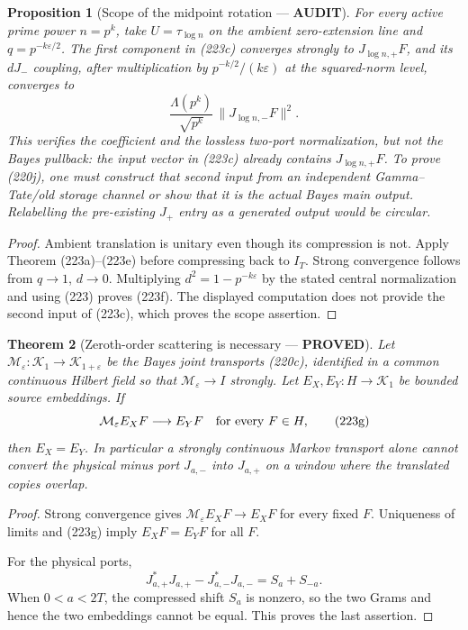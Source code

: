 \documentclass[11pt]{article}
\newtheorem{theorem}{Theorem}
\newtheorem{proposition}[theorem]{Proposition}
\newcommand{\PROVED}{\textcolor{green!45!black}{\textbf{PROVED}}}
\newcommand{\AUDIT}{\textcolor{orange!75!black}{\textbf{AUDIT}}}
\begin{document}
\begin{proposition}[Scope of the midpoint rotation --- \AUDIT]
For every active prime power $n=p^k$, take $U=\tau_{\log n}$ on the ambient
zero-extension line and $q=p^{-k\varepsilon/2}$.  The first component in
(223c) converges strongly to $J_{\log n,+}F$, and its $dJ_-$ coupling, after
multiplication by $p^{-k/2}/(k\varepsilon)$ at the squared-norm level,
converges to
\begin{equation}
 \frac{\Lambda(p^k)}{\sqrt{p^k}}\,
       \|J_{\log n,-}F\|^2.                          \tag{223f}
\end{equation}
This verifies the coefficient and the lossless two-port normalization, but
not the Bayes pullback: the input vector in (223c) already contains
$J_{\log n,+}F$.  To prove (220j), one must construct that second input from
an independent Gamma--Tate/old storage channel or show that it is the actual
Bayes main output.  Relabelling the pre-existing $J_+$ entry as a generated
output would be circular.
\end{proposition}

\begin{proof}
Ambient translation is unitary even though its compression is not.  Apply
Theorem (223a)--(223e) before compressing back to $I_T$.  Strong convergence
follows from $q\to1$, $d\to0$.  Multiplying
$d^2=1-p^{-k\varepsilon}$ by the stated central normalization and using
(223) proves (223f).  The displayed computation does not provide the second
input of (223c), which proves the scope assertion.
\end{proof}

\begin{theorem}[Zeroth-order scattering is necessary --- \PROVED]
Let $\mathcal M_\varepsilon:\mathscr K_1\to\mathscr K_{1+\varepsilon}$ be
the Bayes joint transports (220c), identified in a common continuous Hilbert
field so that $\mathcal M_\varepsilon\to I$ strongly.  Let
$E_X,E_Y:H\to\mathscr K_1$ be bounded source embeddings.  If
\begin{equation}
             \mathcal M_\varepsilon E_XF\longrightarrow E_YF
             \quad\hbox{for every }F\in H,           \tag{223g}
\end{equation}
then $E_X=E_Y$.  In particular a strongly continuous Markov transport alone
cannot convert the physical minus port $J_{a,-}$ into $J_{a,+}$ on a window
where the translated copies overlap.
\end{theorem}

\begin{proof}
Strong convergence gives
$\mathcal M_\varepsilon E_XF\to E_XF$ for every fixed $F$.  Uniqueness of
limits and (223g) imply $E_XF=E_YF$ for all $F$.

For the physical ports,
\begin{equation}
 J_{a,+}^*J_{a,+}-J_{a,-}^*J_{a,-}=S_a+S_{-a}.       \tag{223h}
\end{equation}
When $0<a<2T$, the compressed shift $S_a$ is nonzero, so the two Grams and
hence the two embeddings cannot be equal.  This proves the last assertion.
\end{proof}
\end{document}
